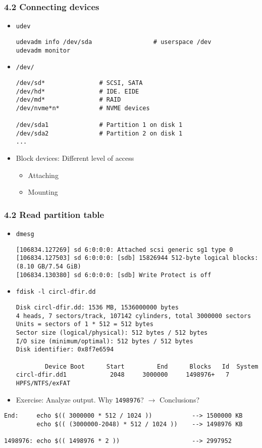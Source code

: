\begin{frame}[fragile]
  \frametitle{4.2 Connecting devices}
    \begin{itemize}
        \item \texttt{udev} 
\begin{lstlisting}[basicstyle=\tiny]
udevadm info /dev/sda                 # userspace /dev
udevadm monitor
\end{lstlisting}
        \item \texttt{/dev/}
\begin{lstlisting}[basicstyle=\tiny]
/dev/sd*               # SCSI, SATA
/dev/hd*               # IDE. EIDE
/dev/md*               # RAID
/dev/nvme*n*           # NVME devices

/dev/sda1              # Partition 1 on disk 1
/dev/sda2              # Partition 2 on disk 1
...
\end{lstlisting}
        \item Block devices: Different level of access
        \begin{itemize}
            \item Attaching
            \item Mounting
        \end{itemize}
    \end{itemize}
\end{frame}


\begin{frame}[fragile]
  \frametitle{4.2 Read partition table}
    \begin{itemize}
        \item \texttt{dmesg} 
\begin{lstlisting}[basicstyle=\tiny]
[106834.127269] sd 6:0:0:0: Attached scsi generic sg1 type 0
[106834.127503] sd 6:0:0:0: [sdb] 15826944 512-byte logical blocks: (8.10 GB/7.54 GiB)
[106834.130380] sd 6:0:0:0: [sdb] Write Protect is off
\end{lstlisting}
        \item \texttt{fdisk -l circl-dfir.dd}
\begin{lstlisting}[basicstyle=\tiny]
Disk circl-dfir.dd: 1536 MB, 1536000000 bytes
4 heads, 7 sectors/track, 107142 cylinders, total 3000000 sectors
Units = sectors of 1 * 512 = 512 bytes
Sector size (logical/physical): 512 bytes / 512 bytes
I/O size (minimum/optimal): 512 bytes / 512 bytes
Disk identifier: 0x8f7e6594

        Device Boot      Start         End      Blocks   Id  System
circl-dfir.dd1            2048     3000000     1498976+   7  HPFS/NTFS/exFAT
\end{lstlisting}
        \item Exercise: Analyze output. Why \texttt{1498976}? $\to$ Conclusions?
    \end{itemize}
\begin{lstlisting}[basicstyle=\tiny]
End:     echo $(( 3000000 * 512 / 1024 ))           --> 1500000 KB
         echo $(( (3000000-2048) * 512 / 1024 ))    --> 1498976 KB

1498976: echo $(( 1498976 * 2 ))                    --> 2997952
\end{lstlisting}
\end{frame}


